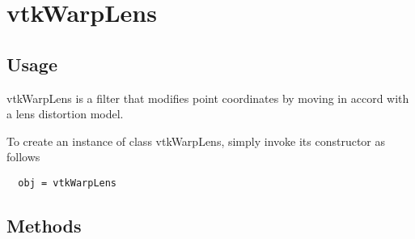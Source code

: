 \section{vtkWarpLens}

\subsection{Usage}

 vtkWarpLens is a filter that modifies point coordinates by moving
 in accord with a lens distortion model.

To create an instance of class vtkWarpLens, simply
invoke its constructor as follows
\begin{verbatim}
  obj = vtkWarpLens
\end{verbatim}
\subsection{Methods}

